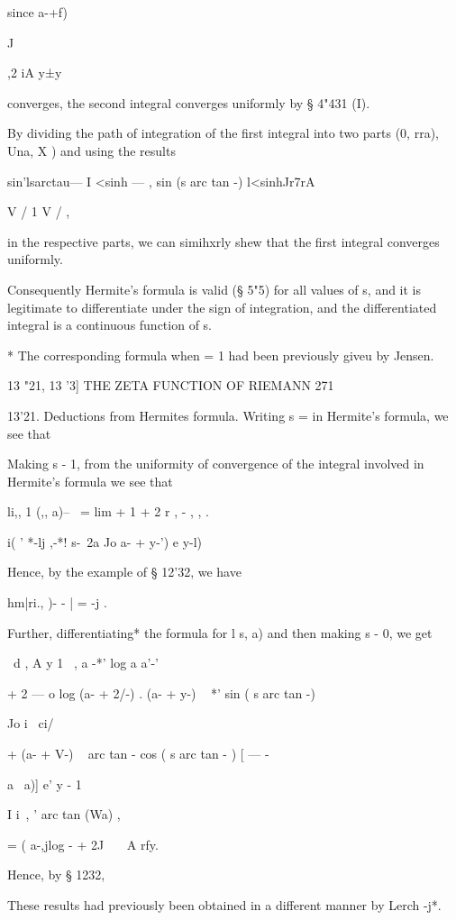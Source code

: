 since a-+f)

  J



,2 iA y±y\



converges, the second integral converges uniformly by § 4"431 (I).

By dividing the path of integration of the first integral into two
parts (0, rra), Una, X ) and using the results

sin'lsarctau— I <sinh — , sin (s arc tan -) l<sinhJr7rA

V / 1 V / ,

in the respective parts, we can simihxrly shew that the first integral
converges uniformly.

Consequently Hermite's formula is valid (§ 5"5) for all values of s,
and it is legitimate to differentiate under the sign of integration,
and the differentiated integral is a continuous function of s.



* The corresponding formula when = 1 had been previously giveu by
Jensen.



13 "21, 13 '3] THE ZETA FUNCTION OF RIEMANN 271

13'21. Deductions from Hermites formula. Writing s = in Hermite's
formula, we see that

Making s - 1, from the uniformity of convergence of the integral
involved in Hermite's formula we see that

li,, 1 (,, a)-- \ = lim + 1 + 2 r , - , , .

  i( ' *-lj ,-*! s-\ 2a Jo a- + y-') e y-l)

Hence, by the example of § 12'32, we have

hm|ri., )- - | = -j .

Further, differentiating* the formula for l s, a) and then making s -
0, we get

\ d , A y 1 \ , a -*' log a a'-'

+ 2 — o log (a- + 2/-) . (a- + y-) ~ *' sin ( s arc tan -)

Jo i \ ci/

+ (a- + V-) ~ arc tan - cos ( s arc tan - ) [ — -

    a \ a)] e' y - 1

I i\ , ' arc tan (Wa) ,

= ( a-,jlog - + 2J \ \ \ A rfy.

Hence, by § 1232,

These results had previously been obtained in a different manner by
Lerch -j*.

